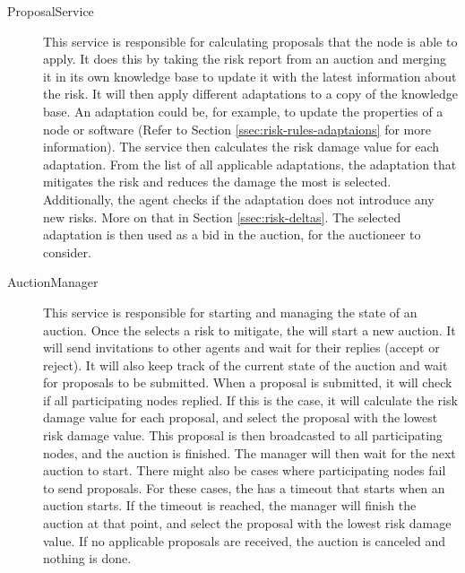 \begin{description}
    \item[ProposalService] This service is responsible for calculating proposals that the node is able to apply. It does this by taking the risk report from an auction and merging it in its own knowledge base to update it with the latest information about the risk. It will then apply different adaptations to a copy of the knowledge base. An adaptation could be, for example, to update the properties of a node or software (Refer to Section \ref{ssec:risk-rules-adaptaions} for more information). The service then calculates the risk damage value for each adaptation. From the list of all applicable adaptations, the adaptation that mitigates the risk and reduces the damage the most is selected. Additionally, the agent checks if the adaptation does not introduce any new risks. More on that in Section \ref{ssec:risk-deltas}. The selected adaptation is then used as a bid in the auction, for the auctioneer to consider. 
    
    \item[AuctionManager] This service is responsible for starting and managing the state of an auction. Once the  selects a risk to mitigate, the  will start a new auction. It will send invitations to other agents and wait for their replies (accept or reject). It will also keep track of the current state of the auction and wait for proposals to be submitted. When a proposal is submitted, it will check if all participating nodes replied. If this is the case, it will calculate the risk damage value for each proposal, and select the proposal with the lowest risk damage value. This proposal is then broadcasted to all participating nodes, and the auction is finished. The manager will then wait for the next auction to start. There might also be cases where participating nodes fail to send proposals. For these cases, the  has a timeout that starts when an auction starts. If the timeout is reached, the manager will finish the auction at that point, and select the proposal with the lowest risk damage value. If no applicable proposals are received, the auction is canceled and nothing is done.
\end{description}


